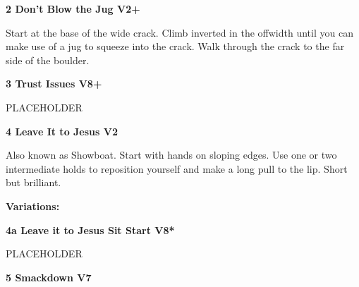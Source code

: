\begin{multicols}{2}
					\begin{minipage}{\linewidth}	
					\label{rt:Don't Blow the Jug}
\colorbox{green!20}{
\parbox{0.95\textwidth}{
\textbf{
2 Don't Blow the Jug V2+    \warn 
}
}
}

					\begin{adjustwidth}{0.5cm}{}				
					Start at the base of the wide crack. Climb inverted in the offwidth until you can make use of a jug to squeeze into the crack. Walk through the crack to the far side of the boulder.
					\end{adjustwidth}
					\end{minipage}
					\begin{minipage}{\linewidth}	
					\label{rt:Trust Issues}
\colorbox{Goldenrod!50}{
\parbox{0.95\textwidth}{
\textbf{
3 Trust Issues V8+  \warn \warn 
}
}
}

					\begin{adjustwidth}{0.5cm}{}				
					PLACEHOLDER
					\end{adjustwidth}
					\end{minipage}
					\begin{minipage}{\linewidth}	
					\label{rt:Leave It to Jesus}
\colorbox{green!20}{
\parbox{0.95\textwidth}{
\textbf{
4 Leave It to Jesus V2     
}
}
}

					\begin{adjustwidth}{0.5cm}{}				
					Also known as Showboat. Start with hands on sloping edges. Use one or two intermediate holds to reposition yourself and make a long pull to the lip. Short but brilliant.
					\end{adjustwidth}
					\end{minipage}
						\begin{adjustwidth}{0.5cm}{}				
						\textbf{Variations:} \newline
							\begin{minipage}{\linewidth}	
							\label{vr:Leave it to Jesus Sit Start}
\colorbox{Goldenrod!50}{
\parbox{0.95\textwidth}{
\textbf{
4a Leave it to Jesus Sit Start V8*  
}
}
}

							\begin{adjustwidth}{0.5cm}{}				
							PLACEHOLDER
							\end{adjustwidth}
							\end{minipage}
						\end{adjustwidth}

					\begin{minipage}{\linewidth}	
					\label{rt:Smackdown}
\colorbox{Goldenrod!50}{
\parbox{0.95\textwidth}{
\textbf{
5 Smackdown V7    
}
}
}


\end{minipage}
\end{multicols}
